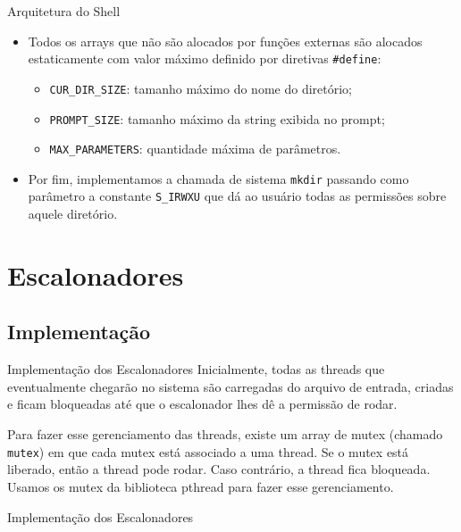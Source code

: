 \documentclass[10pt]{beamer}
\begin{document}
    \begin{frame}{Arquitetura do Shell}
      \begin{itemize}
        \justifying
        \item Todos os arrays que não são alocados por funções externas são alocados estaticamente com valor máximo definido por diretivas \texttt{\#define}:
        \begin{itemize}
          \vspace{-0.25in}
          \item \texttt{CUR\_DIR\_SIZE}: tamanho máximo do nome do diretório;
          \item \texttt{PROMPT\_SIZE}: tamanho máximo da string exibida no prompt;
          \item \texttt{MAX\_PARAMETERS}: quantidade máxima de parâmetros.
        \end{itemize}
        \item Por fim, implementamos a chamada de sistema \texttt{mkdir} passando como parâmetro a constante \texttt{S\_IRWXU} que dá ao usuário todas as permissões sobre aquele diretório.
      \end{itemize}
    \end{frame}
    \section{Escalonadores}
    \subsection{Implementação}
    \begin{frame}{Implementação dos Escalonadores}
    Inicialmente, todas as threads que eventualmente chegarão no sistema são carregadas do arquivo de entrada, criadas e ficam bloqueadas até que o escalonador lhes dê a permissão de rodar.

    Para fazer esse gerenciamento das threads, existe um array de mutex (chamado \texttt{mutex}) em que cada mutex está associado a uma thread. Se o mutex está liberado, então a thread pode rodar. Caso contrário, a thread fica bloqueada. Usamos os mutex da biblioteca pthread para fazer esse gerenciamento.
    \end{frame}
    \begin{frame}{Implementação dos Escalonadores}
    \end{frame}
\end{document}
